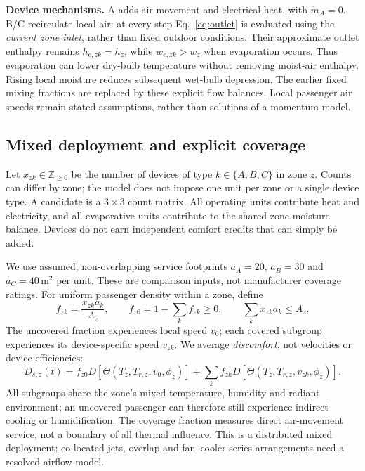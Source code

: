 \noindent\textbf{Device mechanisms.} A adds air movement and electrical heat, with $\dot m_A=0$. B/C recirculate local air: at every step Eq.~\eqref{eq:outlet} is evaluated using the \emph{current zone inlet}, rather than fixed outdoor conditions. Their approximate outlet enthalpy remains $h_{e,zk}=h_z$, while $w_{e,zk}>w_z$ when evaporation occurs. Thus evaporation can lower dry-bulb temperature without removing moist-air enthalpy. Rising local moisture reduces subsequent wet-bulb depression. The earlier fixed mixing fractions are replaced by these explicit flow balances. Local passenger air speeds remain stated assumptions, rather than solutions of a momentum model.

\subsection{Mixed deployment and explicit coverage}

Let $x_{zk}\in\mathbb Z_{\ge0}$ be the number of devices of type $k\in\{A,B,C\}$ in zone $z$. Counts can differ by zone; the model does not impose one unit per zone or a single device type. A candidate is a $3\times3$ count matrix. All operating units contribute heat and electricity, and all evaporative units contribute to the shared zone moisture balance. Devices do not earn independent comfort credits that can simply be added.

We use assumed, non-overlapping service footprints $a_A=20$, $a_B=30$ and $a_C=40\,\mathrm{m^2}$ per unit. These are comparison inputs, not manufacturer coverage ratings. For uniform passenger density within a zone, define
\begin{equation}
 f_{zk}=\frac{x_{zk}a_k}{A_z},\qquad
 f_{z0}=1-\sum_k f_{zk}\ge0,\qquad \sum_kx_{zk}a_k\le A_z.
\label{eq:coverage}
\end{equation}
The uncovered fraction experiences local speed $v_0$; each covered subgroup experiences its device-specific speed $v_{zk}$. We average \emph{discomfort}, not velocities or device efficiencies:
\begin{equation}
 \overline D_{s,z}(t)=f_{z0}D[\Theta(T_z,T_{r,z},v_0,\phi_z)]
 +\sum_k f_{zk}D[\Theta(T_z,T_{r,z},v_{zk},\phi_z)].
\label{eq:mixed-discomfort}
\end{equation}
All subgroups share the zone's mixed temperature, humidity and radiant environment; an uncovered passenger can therefore still experience indirect cooling or humidification. The coverage fraction measures direct air-movement service, not a boundary of all thermal influence. This is a distributed mixed deployment; co-located jets, overlap and fan--cooler series arrangements need a resolved airflow model.

